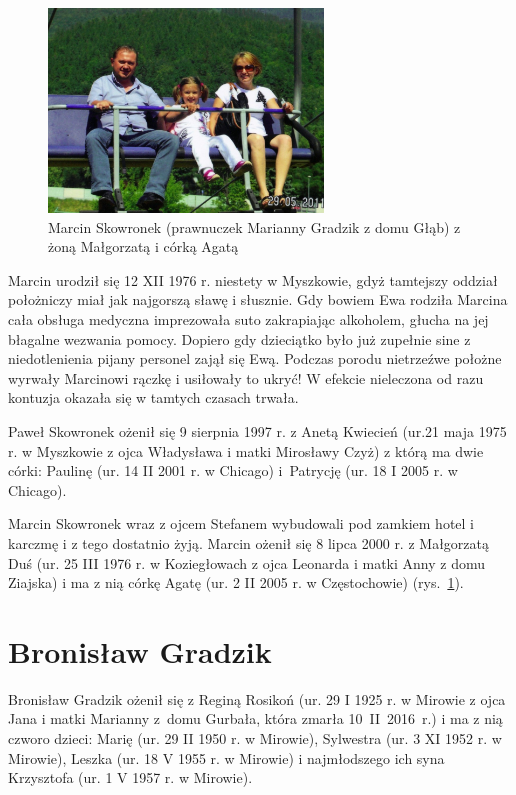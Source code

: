\begin{figure}[!b]
\begin{center}
\includegraphics[width=0.65\textwidth]{zdjecia/malgorzata_marcin_agata_skowronek.jpg}
\caption[Rodzina Marcina Skowronka]{Marcin Skowronek (prawnuczek Marianny Gradzik z domu Głąb) z żoną Małgorzatą i córką Agatą}
\label{rys:malgorzata_marcin_agata_skowronek}
\end{center}
\end{figure}

Marcin urodził się 12 XII 1976 r. niestety w Myszkowie, gdyż tamtejszy oddział położniczy miał jak najgorszą sławę i słusznie. Gdy bowiem Ewa rodziła Marcina cała obsługa medyczna imprezowała suto zakrapiając alkoholem, głucha na jej błagalne wezwania pomocy. Dopiero gdy dzieciątko było już zupełnie sine z niedotlenienia pijany personel zajął się Ewą. Podczas porodu nietrzeźwe położne wyrwały Marcinowi rączkę i usiłowały to ukryć! W efekcie nieleczona od razu kontuzja okazała się w tamtych czasach  trwała.

Paweł Skowronek ożenił się 9 sierpnia 1997 r. z Anetą Kwiecień (ur.21 maja 1975 r. w Myszkowie z ojca Władysława i matki Mirosławy Czyż) z którą ma dwie córki: Paulinę (ur. 14 II 2001 r. w Chicago) i~Patrycję  (ur. 18 I 2005 r. w Chicago).

Marcin Skowronek wraz z ojcem Stefanem wybudowali pod zamkiem hotel i karczmę i z tego dostatnio żyją. Marcin ożenił się 8 lipca 2000 r. z Małgorzatą Duś (ur. 25  III 1976 r. w Koziegłowach z ojca Leonarda i matki Anny z domu Ziajska) i ma z nią córkę Agatę (ur. 2 II 2005 r. w Częstochowie) (rys.~\ref{rys:malgorzata_marcin_agata_skowronek}).


\section{Bronisław Gradzik}
Bronisław Gradzik ożenił się z Reginą Rosikoń (ur. 29 I 1925 r. w Mirowie z ojca Jana i matki Marianny z~domu Gurbała, która zmarła 10~II~2016~r.) i ma z nią czworo dzieci: Marię (ur. 29 II 1950 r. w Mirowie), Sylwestra (ur. 3 XI 1952 r. w Mirowie), Leszka (ur. 18 V 1955 r. w Mirowie) i najmłodszego ich syna Krzysztofa (ur. 1 V 1957 r. w Mirowie). 

